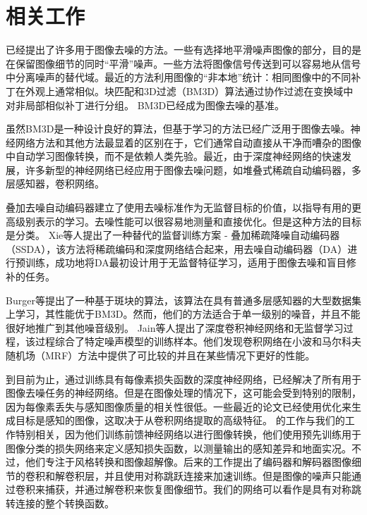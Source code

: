 \section{相关工作}
已经提出了许多用于图像去噪的方法。一些有选择地平滑噪声图像的部分，目的是在保留图像细节的同时“平滑”噪声。一些方法将图像信号传送到可以容易地从信号中分离噪声的替代域。最近的方法利用图像的“非本地”统计：相同图像中的不同补丁在外观上通常相似。块匹配和3D过滤（BM3D）算法\cite{DBLP:journals/tip/DabovFKE07}通过协作过滤在变换域中对非局部相似补丁进行分组。 BM3D已经成为图像去噪的基准。

虽然BM3D是一种设计良好的算法，但基于学习的方法已经广泛用于图像去噪。神经网络方法和其他方法最显着的区别在于，它们通常自动直接从干净而嘈杂的图像中自动学习图像转换，而不是依赖人类先验。最近，由于深度神经网络的快速发展，许多新型的神经网络已经应用于图像去噪问题，如堆叠式稀疏自动编码器\cite{DBLP:conf/icml/VincentLBM08,DBLP:conf/nips/XieXC12,Agostinelli2013,Technologii2013a,Skribtsov2016}，多层感知器\cite{Burger2012,Wang2014a}，卷积网络\cite{Jain2009,Wu2014,Zhao2015,Mao2016,Eigen2013,Wu2014relu,Wang2015g}。

叠加去噪自动编码器\cite{DBLP:conf/icml/VincentLBM08}建立了使用去噪标准作为无监督目标的价值，以指导有用的更高级别表示的学习。去噪性能可以很容易地测量和直接优化。但是这种方法的目标是分类。 Xie等人提出了一种替代的监督训练方案 - 叠加稀疏降噪自动编码器（SSDA），该方法将稀疏编码和深度网络结合起来，用去噪自动编码器（DA）进行预训练，成功地将DA最初设计用于无监督特征学习，适用于图像去噪和盲目修补的任务。

Burger等\cite{Burger2012}提出了一种基于斑块的算法，该算法在具有普通多层感知器的大型数据集上学习，其性能优于BM3D。然而，他们的方法适合于单一级别的噪音，并且不能很好地推广到其他噪音级别。 Jain等人\cite{Jain2009}提出了深度卷积神经网络和无监督学习过程，该过程综合了特定噪声模型的训练样本。他们发现卷积网络在小波和马尔科夫随机场（MRF）方法中提供了可比较的并且在某些情况下更好的性能。

到目前为止，通过训练具有每像素损失函数的深度神经网络，已经解决了所有用于图像去噪任务的神经网络。但是在图像处理的情况下，这可能会受到特别的限制，因为每像素丢失与感知图像质量的相关性很低\cite{Zhao2015}。一些最近的论文已经使用优化来生成目标是感知的图像，这取决于从卷积网络提取的高级特征\cite{Dosovitskiy2016}。 \cite{Johnson2016,Mao2016}的工作与我们的工作特别相关，因为他们训练前馈神经网络以进行图像转换，他们使用预先训练用于图像分类的损失网络来定义感知损失函数，以测量输出的感知差异和地面实况。不过，他们专注于风格转换和图像超解像。后来的工作提出了编码器和解码器图像细节的卷积和解卷积层，并且使用对称跳跃连接来加速训练。但是图像的噪声只能通过卷积来捕获，并通过解卷积来恢复图像细节。我们的网络可以看作是具有对称跳转连接的整个转换函数。

